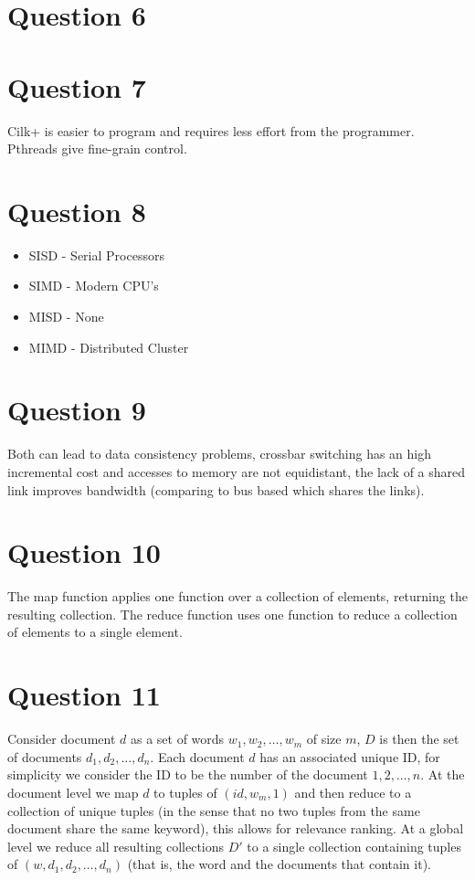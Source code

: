 \documentclass[a4paper, twocolumn]{article}
\begin{document}
\section{Question 6}

\section{Question 7}
Cilk+ is easier to program and requires less effort from the programmer.
Pthreads give fine-grain control.

\section{Question 8}
\begin{itemize}
    \item SISD - Serial Processors
    \item SIMD - Modern CPU's
    \item MISD - None
    \item MIMD - Distributed Cluster
\end{itemize}

\section{Question 9}
Both can lead to data consistency problems,
crossbar switching has an high incremental cost and accesses to memory are not equidistant,
the lack of a shared link improves bandwidth (comparing to bus based which shares the links).

\section{Question 10}
The map function applies one function over a collection of elements, returning the resulting collection.
The reduce function uses one function to reduce a collection of elements to a single element.

\section{Question 11}
Consider document $d$ as a set of words ${w_1, w_2, \dots, w_m}$ of size $m$,
$D$ is then the set of documents ${d_1, d_2, \dots, d_n}$.
Each document $d$ has an associated unique ID, for simplicity we consider the ID to be the number of the document $1, 2, \dots, n$.
At the document level we map $d$ to tuples of $(id, w_m, 1)$ and
then reduce to a collection of unique tuples
(in the sense that no two tuples from the same document share the same keyword),
this allows for relevance ranking.
At a global level we reduce all resulting collections $D'$ to a single collection containing tuples of $(w, {d_1, d_2, \dots, d_n})$
(that is, the word and the documents that contain it).
\end{document}
